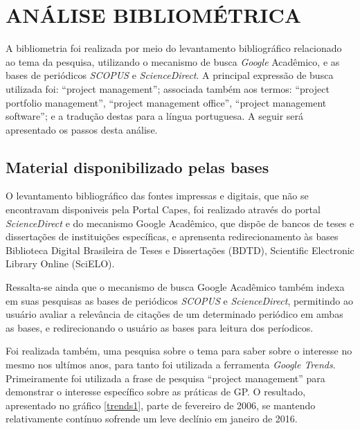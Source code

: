 \apendice
\chapter{ANÁLISE BIBLIOMÉTRICA}

A bibliometria foi realizada por meio do levantamento bibliográfico relacionado ao tema da pesquisa, utilizando o mecanismo de busca \textit{Google} Acadêmico, e as bases de periódicos \textit{SCOPUS} e \textit{ScienceDirect}. A principal expressão de busca utilizada foi: ``project management''; associada também aos termos: ``project portfolio management'', ``project management office'', ``project management software''; e a tradução destas para a língua portuguesa. A seguir será apresentado os passos desta análise.

\section{Material disponibilizado pelas bases}

O levantamento bibliográfico das fontes impressas e digitais, que não se encontravam disponiveis pela Portal Capes, foi realizado através do portal \textit{ScienceDirect} e do mecanismo Google Acadêmico, que dispõe de bancos de teses e dissertações de instituições específicas, e aprensenta redirecionamento às bases Biblioteca Digital Brasileira de Teses e Dissertações (BDTD), Scientific Electronic Library Online (SciELO).

Ressalta-se ainda que o mecanismo de busca Google Acadêmico também indexa em suas pesquisas as bases de periódicos \textit{SCOPUS} e \textit{ScienceDirect}, permitindo ao usuário avaliar a relevância de citações de um determinado periódico em ambas as bases, e redirecionando o usuário as bases para leitura dos períodicos.

Foi realizada também, uma pesquisa sobre o tema para saber sobre o interesse no mesmo nos ultímos anos, para tanto foi utilizada a ferramenta \textit{Google Trends}. Primeiramente foi utilizada a frase de pesquisa ``project management'' para demonstrar o interesse específico sobre as práticas de GP. O resultado, apresentado no gráfico \ref{trends1}, parte de fevereiro de 2006, se mantendo relativamente contínuo sofrende um leve declínio em janeiro de 2016.


